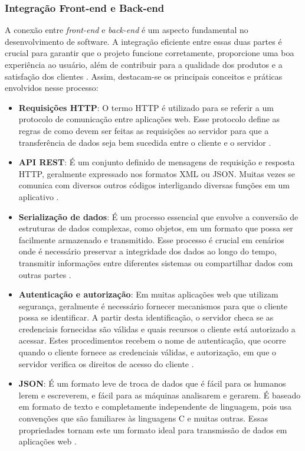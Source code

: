 \subsubsection{Integração Front-end e Back-end}

A conexão entre \textit{front-end} e \textit{back-end} é um aspecto fundamental no desenvolvimento de software. A integração eficiente entre essas duas partes é crucial para garantir que o projeto funcione corretamente, proporcione uma boa experiência ao usuário, além de contribuir para a qualidade dos produtos e a satisfação dos clientes \cite{da2024guia}. Assim, destacam-se os principais conceitos e práticas envolvidos nesse processo:

\begin{itemize}
    \item \textbf{Requisições HTTP}: O termo HTTP é utilizado para se referir a um protocolo de comunicação entre aplicações web. Esse protocolo define as regras de como devem ser feitas as requisições ao servidor para que a transferência de dados seja bem sucedida entre o cliente e o servidor \cite{portilho2021desenvolvimento}.
    \item \textbf{API REST}: É um conjunto definido de mensagens de requisição e resposta HTTP, geralmente expressado nos formatos XML ou JSON. Muitas vezes se comunica com diversos outros códigos interligando diversas funções em um aplicativo \cite{oliveira2014desenvolvimento}.
    \item \textbf{Serialização de dados}: É um processo essencial que envolve a conversão de estruturas de dados complexas, como objetos, em um formato que possa ser facilmente armazenado e transmitido. Esse processo é crucial em cenários onde é necessário preservar a integridade dos dados ao longo do tempo, transmitir informações entre diferentes sistemas ou compartilhar dados com outras partes \cite{castilhos2024analise}.
    \item \textbf{Autenticação e autorização}: Em muitas aplicações web que utilizam segurança, geralmente é necessário fornecer mecanismos para que o cliente possa se identificar. A partir desta identificação, o servidor checa se as credenciais fornecidas são válidas e quais recursos o cliente está autorizado a acessar. Estes procedimentos recebem o nome de autenticação, que ocorre quando o cliente fornece as credenciais válidas, e autorização, em que o servidor verifica os direitos de acesso do cliente \cite{oliveira2014desenvolvimento}.
    \item \textbf{JSON}: É um formato leve de troca de dados que é fácil para os humanos lerem e escreverem, e fácil para as máquinas analisarem e gerarem. É baseado em formato de texto e completamente independente de linguagem, pois usa convenções que são familiares às linguagens C e muitas outras. Essas propriedades tornam este um formato ideal para transmissão de dados em aplicações web \cite{json2025}.
\end{itemize}


